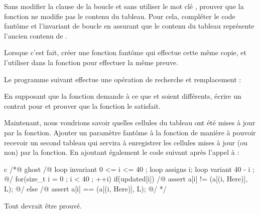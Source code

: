 

Sans modifier la clause  de la boucle et sans utiliser le mot
clé , prouver que la fonction ne modifie pas le
contenu du tableau. Pour cela, compléter le code fantôme et l'invariant de boucle
en assurant que le contenu du tableau  représente l'ancien contenu
de .


Lorsque c'est fait, créer une fonction fantôme qui effectue cette même copie, et
l'utiliser dans la fonction  pour effectuer la même preuve.




Le programme suivant effectue une opération de recherche et remplacement :




En supposant que la fonction  demande à ce que
 et  soient différents, écrire un contrat pour
 et prouver que la fonction le satisfait.


Maintenant, nous voudrions savoir quelles cellules du tableau ont été mises à
jour par la fonction. Ajouter un paramètre fantôme à la fonction
 de manière à pouvoir recevoir un second tableau qui servira
à enregistrer les cellules mises à jour (ou non) par la fonction. En ajoutant
également le code suivant après l'appel à  :


\begin{CodeBlock}{c}
  /*@ ghost
    /@ loop invariant 0 <= i <= 40 ;
       loop assigns i;
       loop variant 40 - i ;
    @/
    for(size_t i = 0 ; i < 40 ; ++i){
      if(updated[i]){
        /@ assert a[i] != \at(a[\at(i, Here)], L); @/
      } else {
        /@ assert a[i] == \at(a[\at(i, Here)], L); @/
      }
    }
  */
  \end{CodeBlock}


  Tout devrait être prouvé.
